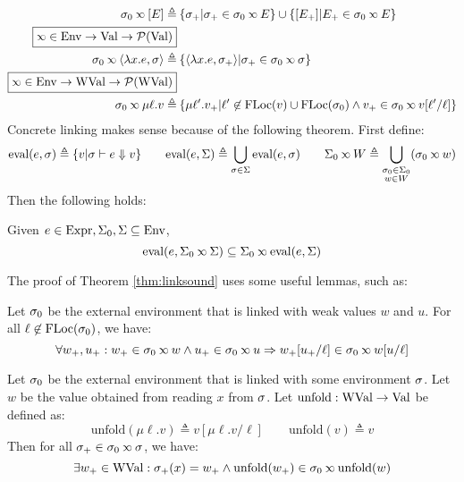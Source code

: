 \begin{align*}
	\ctx_0\semlink[E]\triangleq                            & \: \{\ctx_+|\ctx_+\in\ctx_0\semlink\event\}\cup\{[\event_+]|\event_+\in\ctx_0\semlink\event\}                                             \\
	\fbox{$\semlink\in\Ctx\rightarrow\Value\rightarrow\pset(\Value)$}                                                                                                                                  \\
	\ctx_0\semlink\langle\lambda x.e,\ctx\rangle\triangleq & \: \{\langle\lambda x.e,\ctx_+\rangle|\ctx_+\in\ctx_0\semlink\ctx\}                                                                       \\
	\fbox{$\semlink\in\Ctx\rightarrow\Walue\rightarrow\pset(\Walue)$}                                                                                                                                  \\
	\ctx_0\semlink\mu\ell.v\triangleq                      & \: \{\mu\ell'.v_+|\ell'\not\in\FLoc(v)\cup\FLoc(\ctx_0)\land v_+\in\ctx_0\semlink v[\ell'/\ell]\}
\end{align*}
Concrete linking makes sense because of the following theorem.
First define:
\[\eval(e,\ctx)\triangleq\{v|\ctx\vdash e\Downarrow v\}\qquad\eval(e,\Sigma)\triangleq\bigcup_{\ctx\in\Sigma}\eval(e,\ctx)\qquad\Sigma_0\semlink W\triangleq\bigcup_{\substack{\ctx_0\in\Sigma_0\\w\in W}}(\ctx_0\semlink w)\]
Then the following holds:
\begin{thm}[Advance]\label{thm:linksound}
	Given $e\in\text{Expr},\Sigma_0,\Sigma\subseteq\text{Env}$,
	\[\eval(e,\Sigma_0\semlink\Sigma)\subseteq\Sigma_0\semlink\eval(e,\Sigma)\]
\end{thm}

The proof of Theorem \ref{thm:linksound} uses some useful lemmas, such as:
\begin{lem}
	Let $\sigma_0$ be the external environment that is linked with weak values $w$ and $u$.
	For all $\ell\not\in\text{FLoc}(\sigma_0)$, we have:
	\[\forall w_+,u_+:w_+\in\ctx_0\semlink w\wedge u_+\in\ctx_0\semlink u\Rightarrow w_+[u_+/\ell]\in\ctx_0\semlink w[u/\ell]\]
\end{lem}
\begin{lem}
	Let $\sigma_0$ be the external environment that is linked with some environment $\sigma$.
	Let $w$ be the value obtained from reading $x$ from $\sigma$.
	Let $\text{unfold}:\text{WVal}\rightarrow\text{Val}$ be defined as:
	\[\text{unfold}(\mu\ell.v)\triangleq v[\mu\ell.v/\ell]\qquad\text{unfold}(v)\triangleq v\]
	Then for all $\ctx_+\in\ctx_0\semlink\ctx$, we have:
	\[\exists w_+\in\Walue:\ctx_+(x)=w_+\land\text{unfold}(w_+)\in\ctx_0\semlink\text{unfold}(w)\]
\end{lem}


